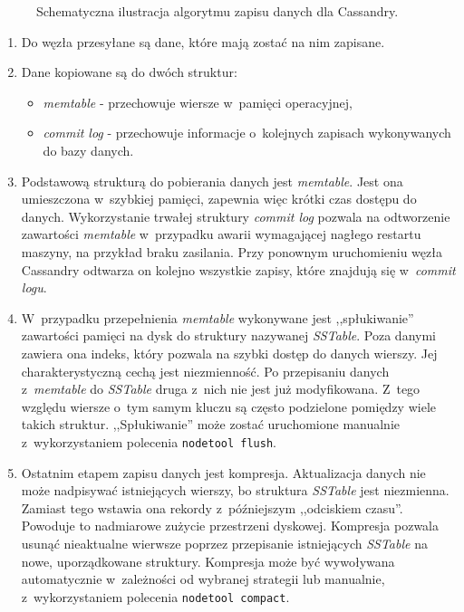 \begin{figure}[ht!]
	\caption{Schematyczna ilustracja algorytmu zapisu danych dla Cassandry.}
	\label{fig:cassandra_data_store_diagram}
\end{figure}

\begin{enumerate}
	\item Do węzła przesyłane są dane, które mają zostać na nim zapisane. 
	\item Dane kopiowane są do dwóch struktur:
		\begin{itemize}
			\item \emph{memtable} - przechowuje wiersze w~pamięci operacyjnej,
			\item \emph{commit log} - przechowuje informacje o~kolejnych zapisach wykonywanych do bazy danych.
		\end{itemize}
	\item Podstawową strukturą do pobierania danych jest \emph{memtable}. Jest ona umieszczona w~szybkiej pamięci, zapewnia więc krótki czas dostępu do danych. Wykorzystanie trwałej struktury \emph{commit log} pozwala na odtworzenie zawartości \emph{memtable} w~przypadku awarii wymagającej nagłego restartu maszyny, na przykład braku zasilania. Przy ponownym uruchomieniu węzła Cassandry odtwarza on kolejno wszystkie zapisy, które znajdują się w~\emph{commit logu}.
	\item W~przypadku przepełnienia \emph{memtable} wykonywane jest ,,spłukiwanie'' zawartości pamięci na dysk do struktury nazywanej \emph{SSTable}. Poza danymi zawiera ona indeks, który pozwala na szybki dostęp do danych wierszy. Jej charakterystyczną cechą jest niezmienność. Po przepisaniu danych z~\emph{memtable} do \emph{SSTable} druga z~nich nie jest już modyfikowana. Z~tego względu wiersze o~tym samym kluczu są często podzielone pomiędzy wiele takich struktur. ,,Spłukiwanie'' może zostać uruchomione manualnie z~wykorzystaniem polecenia \verb+nodetool flush+.
	\item Ostatnim etapem zapisu danych jest kompresja. Aktualizacja danych nie może nadpisywać istniejących wierszy, bo struktura \emph{SSTable} jest niezmienna. Zamiast tego wstawia ona rekordy z~późniejszym ,,odciskiem czasu''. Powoduje to nadmiarowe zużycie przestrzeni dyskowej. Kompresja pozwala usunąć nieaktualne wierwsze poprzez przepisanie istniejących \emph{SSTable} na nowe, uporządkowane struktury. Kompresja może być wywoływana automatycznie w~zależności od wybranej strategii lub manualnie, z~wykorzystaniem polecenia \verb+nodetool compact+.
\end{enumerate}

